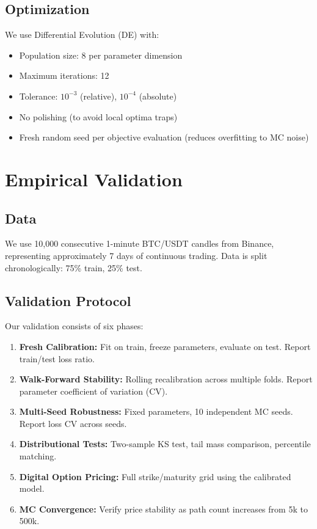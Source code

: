 \documentclass[11pt,a4paper]{article}
\begin{document}
\subsection{Optimization}

We use Differential Evolution (DE) with:
\begin{itemize}[nosep]
  \item Population size: 8 per parameter dimension
  \item Maximum iterations: 12
  \item Tolerance: $10^{-3}$ (relative), $10^{-4}$ (absolute)
  \item No polishing (to avoid local optima traps)
  \item Fresh random seed per objective evaluation (reduces overfitting to MC noise)
\end{itemize}

\section{Empirical Validation}
\label{sec:validation}

\subsection{Data}

We use 10,000 consecutive 1-minute BTC/USDT candles from Binance,
representing approximately 7 days of continuous trading. Data is split
chronologically: 75\% train, 25\% test.

\subsection{Validation Protocol}

Our validation consists of six phases:

\begin{enumerate}
  \item \textbf{Fresh Calibration:} Fit on train, freeze parameters,
    evaluate on test. Report train/test loss ratio.
  \item \textbf{Walk-Forward Stability:} Rolling recalibration across
    multiple folds. Report parameter coefficient of variation (CV).
  \item \textbf{Multi-Seed Robustness:} Fixed parameters, 10 independent
    MC seeds. Report loss CV across seeds.
  \item \textbf{Distributional Tests:} Two-sample KS test, tail mass
    comparison, percentile matching.
  \item \textbf{Digital Option Pricing:} Full strike/maturity grid using
    the calibrated model.
  \item \textbf{MC Convergence:} Verify price stability as path count
    increases from 5k to 500k.
\end{enumerate}
\end{document}
